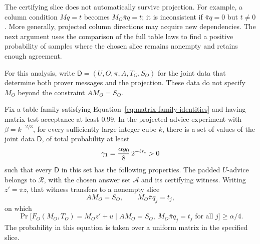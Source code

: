 The certifying slice does not automatically survive projection.  For
example, a column condition $Mq=t$ becomes $M_O\bar\pi q=t$; it is
inconsistent if $\bar\pi q=0$ but $t\ne0$.  More generally, projected
column directions may acquire new dependencies.  The next argument uses
the comparison of the full table laws to find a positive probability of samples
where the chosen slice remains nonempty and retains enough agreement.

For this analysis, write
$\mathsf D=(U,O,\pi,A,T_O,S_O)$ for the joint data that determine both prover
messages and the projection.  These data do not specify $M_O$ beyond the
constraint $AM_O=S_O$.

\begin{lemma}
\label{lem:projected-witness}
Fix a table family satisfying Equation~\eqref{eq:matrix-family-identities}
and having matrix-test acceptance at least $0.99$.  In the projected
advice experiment with $\beta=k^{-2/3}$, for every sufficiently large
integer cube $k$, there is a set of values of the joint data $\mathsf D$, of
total probability at least
\begin{equation}
 \gamma_1=\frac{\alpha g_0}{8}\,2^{-\ell r_{\rm s}}>0
 \label{eq:projected-witness-mass}
\end{equation}
such that every $\mathsf D$ in this set has the following properties.
The padded $U$-advice belongs to $\mathcal R$, with the chosen answer set $\mathcal A$ and its
certifying witness.  Writing $z'=\bar\pi z$, that witness transfers to a
nonempty slice
\[
 AM_O=S_O,\qquad M_O\bar\pi q_j=t_j,
\]
on which
\begin{equation}
 \Pr\bigl[F_O(M_O,T_O)=M_Oz'+u\mid
           AM_O=S_O,\ M_O\bar\pi q_j=t_j\text{ for all }j\bigr]
 \ge\alpha/4.
 \label{eq:transferred-witness}
\end{equation}
The probability in this equation is taken over a uniform matrix in the
specified slice.
\end{lemma}


